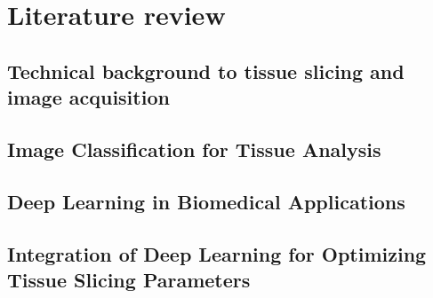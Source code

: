 





\section{Literature review}

\subsection{Technical background to tissue slicing and image acquisition}


\subsection{Image Classification for Tissue Analysis}



\subsection{Deep Learning in Biomedical Applications}


\subsection{Integration of Deep Learning for Optimizing Tissue Slicing Parameters}



\FloatBarrier %



